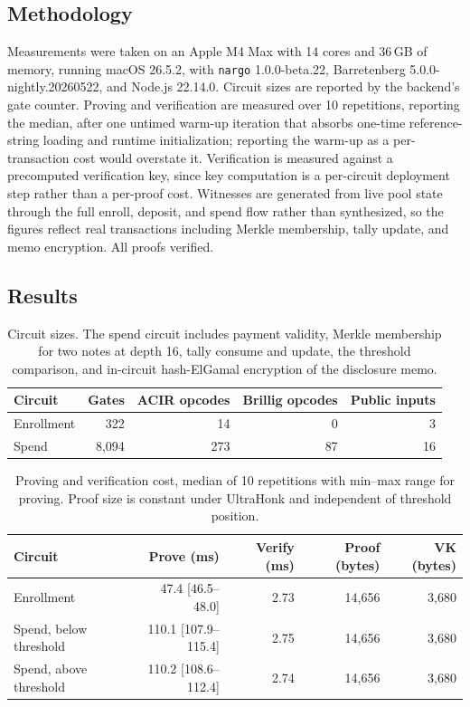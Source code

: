 \documentclass[11pt,a4paper]{article}
\theoremstyle{definition}
\theoremstyle{plain}
\theoremstyle{remark}
\begin{document}
\subsection{Methodology}

Measurements were taken on an Apple M4 Max with 14 cores and 36\,GB of memory, running macOS 26.5.2, with \texttt{nargo} 1.0.0-beta.22, Barretenberg 5.0.0-nightly.20260522, and Node.js 22.14.0. Circuit sizes are reported by the backend's gate counter. Proving and verification are measured over 10 repetitions, reporting the median, after one untimed warm-up iteration that absorbs one-time reference-string loading and runtime initialization; reporting the warm-up as a per-transaction cost would overstate it. Verification is measured against a precomputed verification key, since key computation is a per-circuit deployment step rather than a per-proof cost. Witnesses are generated from live pool state through the full enroll, deposit, and spend flow rather than synthesized, so the figures reflect real transactions including Merkle membership, tally update, and memo encryption. All proofs verified.

\subsection{Results}

\begin{table}[t]
\centering
\small
\begin{tabular}{@{}lrrrr@{}}
\toprule
\textbf{Circuit} & \textbf{Gates} & \textbf{ACIR opcodes} & \textbf{Brillig opcodes} & \textbf{Public inputs} \\
\midrule
Enrollment & 322 & 14 & 0 & 3 \\
Spend & 8{,}094 & 273 & 87 & 16 \\
\bottomrule
\end{tabular}
\caption{Circuit sizes. The spend circuit includes payment validity, Merkle membership for two notes at depth 16, tally consume and update, the threshold comparison, and in-circuit hash-ElGamal encryption of the disclosure memo.}
\label{tab:sizes}
\end{table}

\begin{table}[t]
\centering
\small
\begin{tabular}{@{}lrrrr@{}}
\toprule
\textbf{Circuit} & \textbf{Prove (ms)} & \textbf{Verify (ms)} & \textbf{Proof (bytes)} & \textbf{VK (bytes)} \\
\midrule
Enrollment & 47.4 \; {\footnotesize[46.5--48.0]} & 2.73 & 14{,}656 & 3{,}680 \\
Spend, below threshold & 110.1 \; {\footnotesize[107.9--115.4]} & 2.75 & 14{,}656 & 3{,}680 \\
Spend, above threshold & 110.2 \; {\footnotesize[108.6--112.4]} & 2.74 & 14{,}656 & 3{,}680 \\
\bottomrule
\end{tabular}
\caption{Proving and verification cost, median of 10 repetitions with min--max range for proving. Proof size is constant under UltraHonk and independent of threshold position.}
\label{tab:perf}
\end{table}
\end{document}
